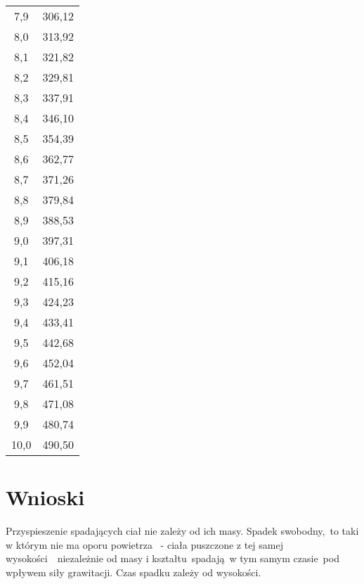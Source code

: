 \documentclass{article}
\begin{document}
\begin{center}
\begin{longtable}{|c|c|}
7,9      & 306,12   \\
8,0      & 313,92   \\
8,1      & 321,82   \\
8,2      & 329,81   \\
8,3      & 337,91   \\
8,4      & 346,10   \\
8,5      & 354,39   \\
8,6      & 362,77   \\
8,7      & 371,26   \\
8,8      & 379,84   \\
8,9      & 388,53   \\
9,0      & 397,31   \\
9,1      & 406,18   \\
9,2      & 415,16   \\
9,3      & 424,23   \\
9,4      & 433,41   \\
9,5      & 442,68   \\
9,6      & 452,04   \\
9,7      & 461,51   \\
9,8      & 471,08   \\
9,9      & 480,74   \\
10,0     & 490,50  
\end{longtable}
\end{center}


\section{Wnioski}
Przyspieszenie spadających ciał nie zależy od ich masy. Spadek swobodny, to taki w
którym nie ma oporu powietrza  - ciała puszczone z tej samej wysokości  niezależnie
od masy i kształtu spadają w tym samym czasie pod wpływem siły grawitacji. Czas
spadku zależy od wysokości.
 \\ 

 \begin{center}
\end{center}
\end{document}
